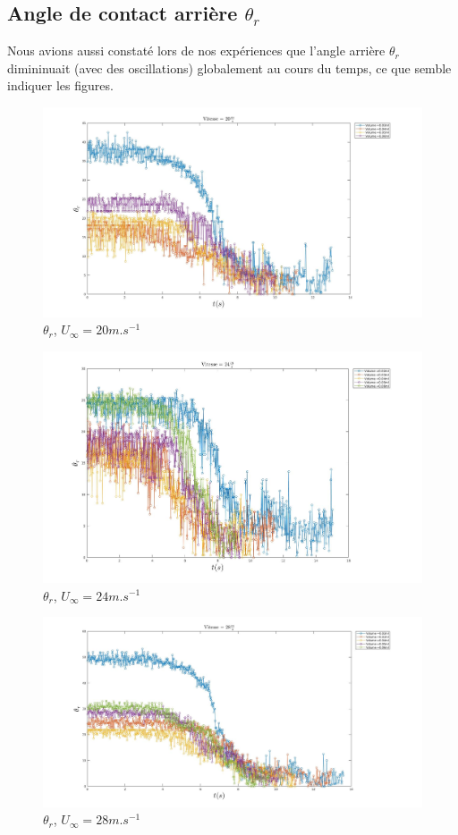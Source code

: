 \documentclass[french]{article}
\begin{document}
\subsection{Angle de contact arrière $\theta_{r}$}

Nous avions aussi constaté lors de nos expériences que l'angle arrière $\theta_{r}$ dimininuait (avec des oscillations) globalement au cours du temps, ce que semble indiquer les figures.\\

\begin{figure}[ht]
	\centering
	\includegraphics[width = \linewidth]{./image/v=20or_2.jpg}
	\caption{$\theta_{r}$, $U_{\infty}=20m.s^{-1}$}
\end{figure}
\begin{figure}[hb]
	\centering
	\includegraphics[width = \linewidth]{./image/v=24or_2.jpg}
	\caption{$\theta_{r}$, $U_{\infty}=24m.s^{-1}$}
\end{figure}
\begin{figure}[h]
	\centering
	\includegraphics[width = \linewidth]{./image/v=28or_2.jpg}
	\caption{$\theta_{r}$, $U_{\infty}=28m.s^{-1}$}
\end{figure}
\end{document}
